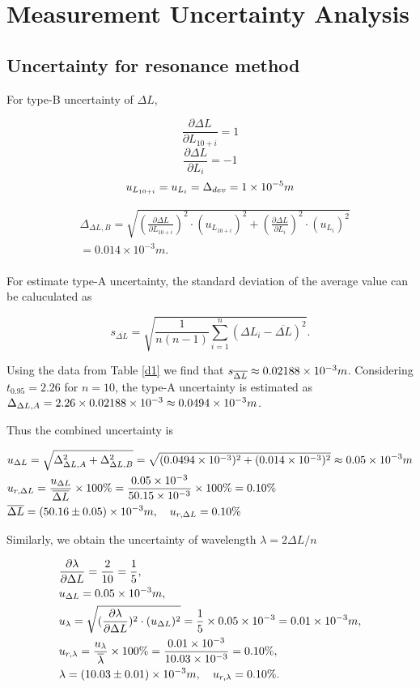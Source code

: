 \section{Measurement Uncertainty Analysis}

\subsection{Uncertainty for resonance method}

For type-B uncertainty of $\Delta L$,

$$ \frac{\partial \Delta L}{\partial L_{10+i}}=1 $$
$$ \frac{\partial \Delta L}{\partial L_i}=-1 $$
$$ u_{L_{10+i}}=u_{L_i}=\Delta_{dev}=1\times 10^{-5}m $$  

\[
\begin{split}
    &\Delta_{\Delta L,B}=\sqrt{(\frac{\partial \Delta L}{\partial
        L_{10+i}})^2\cdot (u_{L_{10+i}})^2+(\frac{\partial \Delta
        L}{\partial L_i})^2\cdot (u_{L_i})^2}\\ 
    &=0.014 \times 10^{-3}m.\\
\end{split}
\]

For estimate type-A uncertainty,
the standard deviation of the average value can be caluculated as

\[
    s_{\overline{\Delta L}}=\sqrt{\frac{1}{n(n-1)}\sum_{i=1}^n(\Delta
      L_i-\overline{\Delta L})^2}. 
\]

Using the data from Table \ref{d1} we find that $s_{\overline{\Delta
    L}}\approx 0.02188\times 10^{-3}m$.
Considering $t_{0.95}=2.26$ for $n=10$, the type-A uncertainty is estimated as
$\Delta_{\Delta L,A}=2.26\times0.02188\times 10^{-3}\approx 0.0494\times 10^{-3}m$.

Thus the combined uncertainty is 

\[
\begin{split}
    &u_{\Delta L}=\sqrt{\Delta_{\Delta L,A}^2+\Delta_{\Delta
        L,B}^2}=\sqrt{(0.0494\times 10^{-3})^2+(0.014\times 10^{-3})^2}\approx0.05\times 10^{-3}m\\ 
    &u_{r,\Delta L}=\frac{u_{\Delta L}}{\overline{\Delta L}}\times
    100\%=\frac{0.05\times 10^{-3}}{50.15\times 10^{-3}}\times100\%=0.10\%\\ 
    &\overline{\Delta L}=(50.16\pm 0.05)\times 10^{-3}m,\quad u_{r,\Delta L}=0.10\% 
\end{split}
\]

Similarly, we obtain the uncertainty of wavelength $\lambda=2\Delta L/n$

\[
\begin{split}
    &\frac{\partial \lambda}{\partial \Delta L}=\frac{2}{10}=\frac{1}{5},\\ 
    &u_{\Delta L}=0.05\times 10^{-3}m,\\
    &u_{\lambda}=\sqrt{(\frac{\partial \lambda}{\partial \Delta L})^2\cdot 
      (u_{\Delta L})^2}=\frac{1}{5}\times 0.05\times 10^{-3}=0.01\times 10^{-3}m,\\ 
    &u_{r,\lambda}=\frac{u_{\lambda}}{\overline{\lambda}}\times 
    100\%=\frac{0.01\times 10^{-3}}{10.03\times 10^{-3}}=0.10\%,\\ 
    &\lambda=(10.03\pm0.01)\times 10^{-3}m,\quad u_{r,\lambda}=0.10\%.
\end{split}
\]

